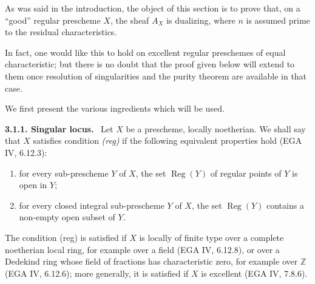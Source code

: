 \documentclass[11pt]{article}
\DeclareMathOperator{\Reg}{Reg}
\providecommand{\ZZ}{\mathbb{Z}}
\newenvironment{statement}[1]{\par\medskip\noindent\textbf{#1.}\ }{\par\medskip}
\begin{document}
As was said in the introduction, the object of this section is to prove that, on a ``good'' regular prescheme $X$, the sheaf $A_X$ is dualizing, where $n$ is assumed prime to the residual characteristics.

In fact, one would like this to hold on excellent regular preschemes of equal characteristic; but there is no doubt that the proof given below will extend to them once resolution of singularities and the purity theorem are available in that case.

We first present the various ingredients which will be used.

\begin{statement}{3.1.1. Singular locus}
Let $X$ be a prescheme, locally noetherian. We shall say that $X$ satisfies condition \emph{(reg)} if the following equivalent properties hold (EGA IV, 6.12.3):
\begin{enumerate}[label=(\roman*)]
\item for every sub-prescheme $Y$ of $X$, the set $\Reg(Y)$ of regular points of $Y$ is open in $Y$;
\item for every closed integral sub-prescheme $Y$ of $X$, the set $\Reg(Y)$ contains a non-empty open subset of $Y$.
\end{enumerate}
The condition (reg) is satisfied if $X$ is locally of finite type over a complete noetherian local ring, for example over a field (EGA IV, 6.12.8), or over a Dedekind ring whose field of fractions has characteristic zero, for example over $\ZZ$ (EGA IV, 6.12.6); more generally, it is satisfied if $X$ is excellent (EGA IV, 7.8.6).
\end{statement}
\end{document}
